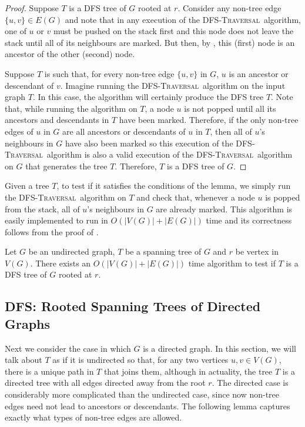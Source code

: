 \documentclass[lotsofwhite]{patmorin}
\newcommand{\dfst}{\textsc{DFS-Traversal}}
\begin{document}
\begin{proof} 

Suppose $T$ is a DFS tree of $G$ rooted at $r$.  Consider any non-tree
edge $\{u,v\}\in E(G)$ and note that in any execution of the \dfst\
algorithm, one of $u$ or $v$ must be pushed on the stack first and
this node does not leave the stack until all of its neighbours are
marked.  But then, by \lemref{ancestor}, this (first) node is an
ancestor of the other (second) node.

Suppose $T$ is such that, for every non-tree edge $\{u,v\}$ in $G$,
$u$ is an ancestor or descendant of $v$.  Imagine running the \dfst\
algorithm on the input graph $T$.  In this case, the algorithm will
certainly produce the DFS tree $T$.  Note that, while running the
algorithm on $T$, a node $u$ is not popped until all its ancestors and
descendants in $T$ have been marked.  Therefore, if the only non-tree
edges of $u$ in $G$ are all ancestors or descendants of $u$ in $T$,
then all of $u$'s neighbours in $G$ have also been marked so this
execution of the \dfst\ algorithm is also a valid execution of the
\dfst\ algorithm on $G$ that generates the tree $T$.  Therefore, $T$
is a DFS tree of $G$.
\end{proof}

Given a tree $T$, to test if it satisfies the conditions of the lemma,
we simply run the \dfst\ algorithm on $T$ and check that, whenever a
node $u$ is popped from the stack, all of $u$'s neighbours in $G$ are
already marked.  This algorithm is easily implemented to run in
$O(|V(G)|+|E(G)|)$ time and its correctness follows from the proof of
\lemref{back-edges}.

\begin{thm} 
Let $G$ be an undirected graph, $T$ be a spanning tree of $G$ and $r$
be vertex in $V(G)$.  There exists an $O(|V(G)|+|E(G)|)$ time
algorithm to test if $T$ is a DFS tree of $G$ rooted at $r$.
\end{thm}

\subsection{DFS: Rooted Spanning Trees of Directed Graphs}

Next we consider the case in which $G$ is a directed graph. In this
section, we will talk about $T$ as if it is undirected so that, for
any two vertices $u,v\in V(G)$, there is a unique path in $T$ that joins
them, although in actuality, the tree $T$ is a directed tree with all
edges directed away from the root $r$.  The directed case is
considerably more complicated than the undirected case, since now
non-tree edges need not lead to ancestors or descendants.  The
following lemma captures exactly what types of non-tree edges are
allowed.
\end{document}
